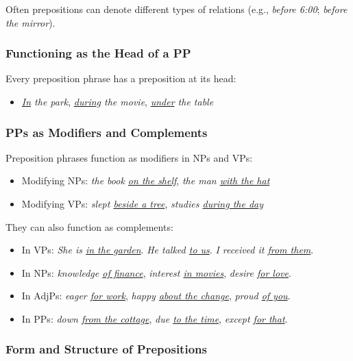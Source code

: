 \noindent Often prepositions can denote different types of relations (e.g., \textit{before 6:00}; \textit{before the mirror}).

\subsubsection*{Functioning as the Head of a PP}

Every preposition phrase has a preposition at its head:

\begin{itemize}
   \item \textit{\uline{In} the park}, \textit{\uline{during} the movie}, \textit{\uline{under} the table}
\end{itemize}

\subsubsection*{PPs as Modifiers and Complements}

Preposition phrases function as modifiers in NPs and VPs:

\begin{itemize}
   \item Modifying NPs: \textit{the book \uline{on the shelf}}, \textit{the man \uline{with the hat}}
   \item Modifying VPs: \textit{slept \uline{beside a tree}}, \textit{studies \uline{during the day}}
\end{itemize}

They can also function as complements:

\begin{itemize}
   \item In VPs: \textit{She is \uline{in the garden}}. \textit{He talked \uline{to us}}. \textit{I received it \uline{from them}}. 
   \item In NPs: \textit{knowledge \uline{of finance}}, \textit{interest \uline{in movies}}, \textit{desire \uline{for love}}.
   \item In AdjPs: \textit{eager \uline{for work}}, \textit{happy \uline{about the change}}, \textit{proud \uline{of you}}.
   \item In PPs: \textit{down \uline{from the cottage}}, \textit{due \uline{to the time}}, \textit{except \uline{for that}}.
\end{itemize}

\subsubsection*{Form and Structure of Prepositions}

